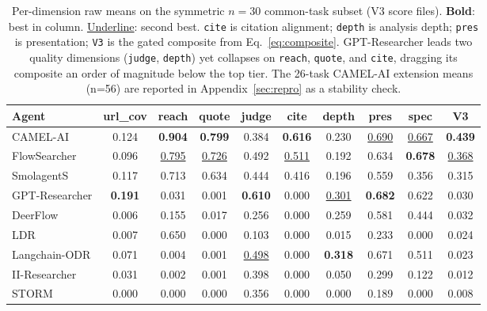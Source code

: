 \documentclass{article}
\begin{document}
\begin{table}[t]
\centering
\caption{Per-dimension raw means on the symmetric $n{=}30$ common-task subset (V3 score files). \textbf{Bold}: best in column. \underline{Underline}: second best. \texttt{cite} is citation alignment; \texttt{depth} is analysis depth; \texttt{pres} is presentation; \texttt{V3} is the gated composite from Eq.~\eqref{eq:composite}. GPT-Researcher leads two quality dimensions (\texttt{judge}, \texttt{depth}) yet collapses on \texttt{reach}, \texttt{quote}, and \texttt{cite}, dragging its composite an order of magnitude below the top tier. The 26-task CAMEL-AI extension means (n=56) are reported in Appendix~\ref{sec:repro} as a stability check.}
\label{tab:profiles}
\vspace{1mm}
\footnotesize
\setlength{\tabcolsep}{3pt}
\begin{tabular}{@{}lccccccccc@{}}
\toprule
\textbf{Agent} & \textbf{url\_cov} & \textbf{reach} & \textbf{quote} & \textbf{judge} & \textbf{cite} & \textbf{depth} & \textbf{pres} & \textbf{spec} & \textbf{V3} \\
\midrule
CAMEL-AI         & 0.124 & \textbf{0.904} & \textbf{0.799} & 0.384 & \textbf{0.616} & 0.230 & \underline{0.690} & \underline{0.667} & \textbf{0.439} \\
FlowSearcher     & 0.096 & \underline{0.795} & \underline{0.726} & 0.492 & \underline{0.511} & 0.192 & 0.634 & \textbf{0.678} & \underline{0.368} \\
SmolagentS       & 0.117 & 0.713 & 0.634 & 0.444 & 0.416 & 0.196 & 0.559 & 0.356 & 0.315 \\
GPT-Researcher   & \textbf{0.191} & 0.031 & 0.001 & \textbf{0.610} & 0.000 & \underline{0.301} & \textbf{0.682} & 0.622 & 0.030 \\
DeerFlow         & 0.006 & 0.155 & 0.017 & 0.256 & 0.000 & 0.259 & 0.581 & 0.444 & 0.032 \\
LDR              & 0.007 & 0.650 & 0.000 & 0.103 & 0.000 & 0.015 & 0.233 & 0.000 & 0.024 \\
Langchain-ODR    & 0.071 & 0.004 & 0.001 & \underline{0.498} & 0.000 & \textbf{0.318} & 0.671 & 0.511 & 0.023 \\
II-Researcher    & 0.031 & 0.002 & 0.001 & 0.398 & 0.000 & 0.050 & 0.299 & 0.122 & 0.012 \\
STORM            & 0.000 & 0.000 & 0.000 & 0.356 & 0.000 & 0.000 & 0.189 & 0.000 & 0.008 \\
\bottomrule
\end{tabular}
\end{table}
\end{document}
